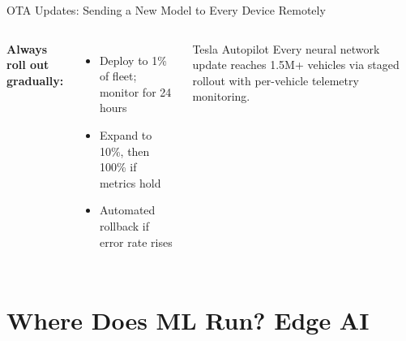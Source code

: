 \documentclass[aspectratio=169,11pt]{beamer}
\begin{document}
\begin{frame}[shrink]{OTA Updates: Sending a New Model to Every Device Remotely}
\begin{columns}
        \textbf{Always roll out gradually:}
        \begin{itemize}\setlength{\itemsep}{2pt}
            \item Deploy to 1\% of fleet; monitor for 24 hours
            \item Expand to 10\%, then 100\% if metrics hold
            \item Automated rollback if error rate rises
        \end{itemize}
        \vspace{0.08cm}
        \begin{exampleblock}{Tesla Autopilot}
            Every neural network update reaches 1.5M+ vehicles via staged rollout with per-vehicle telemetry monitoring.
        \end{exampleblock}
    \end{columns}
\end{frame}

\section{Where Does ML Run? Edge AI}
\end{document}
